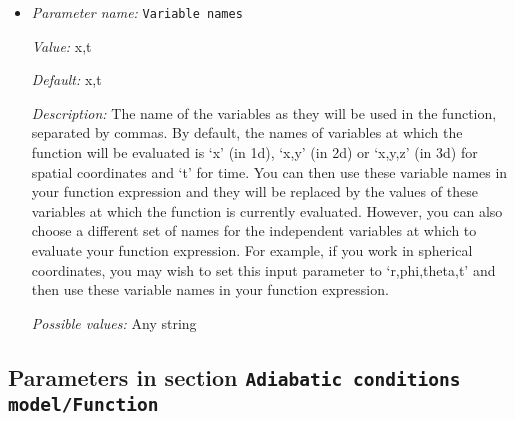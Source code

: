 \begin{itemize}
{\it Possible values:} Any string
\item {\it Parameter name:} {\tt Variable names}
\label{parameters:Adiabatic conditions model/Compute profile/Surface condition function/Variable names}


{\it Value:} x,t


{\it Default:} x,t


{\it Description:} The name of the variables as they will be used in the function, separated by commas. By default, the names of variables at which the function will be evaluated is `x' (in 1d), `x,y' (in 2d) or `x,y,z' (in 3d) for spatial coordinates and `t' for time. You can then use these variable names in your function expression and they will be replaced by the values of these variables at which the function is currently evaluated. However, you can also choose a different set of names for the independent variables at which to evaluate your function expression. For example, if you work in spherical coordinates, you may wish to set this input parameter to `r,phi,theta,t' and then use these variable names in your function expression.


{\it Possible values:} Any string
\end{itemize}

\subsection{Parameters in section \tt Adiabatic conditions model/Function}
\label{parameters:Adiabatic_20conditions_20model/Function}

